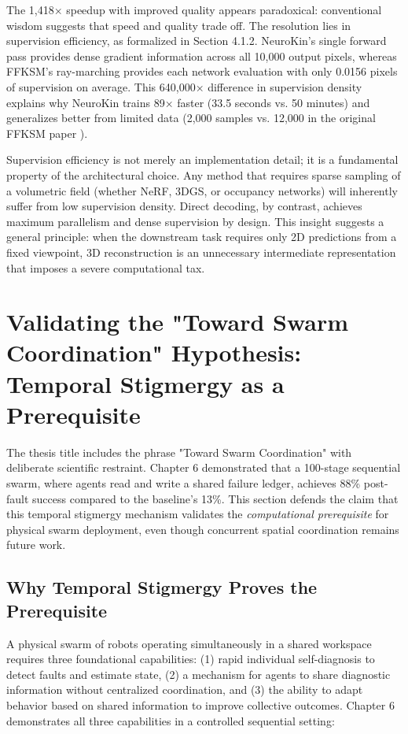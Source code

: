 \documentclass[12pt,a4paper,oneside]{report}
\begin{document}
The 1,418× speedup with improved quality appears paradoxical: conventional wisdom suggests that speed and quality trade off. The resolution lies in supervision efficiency, as formalized in Section 4.1.2. NeuroKin's single forward pass provides dense gradient information across all 10,000 output pixels, whereas FFKSM's ray-marching provides each network evaluation with only 0.0156 pixels of supervision on average. This 640,000× difference in supervision density explains why NeuroKin trains 89× faster (33.5 seconds vs. 50 minutes) and generalizes better from limited data (2,000 samples vs. 12,000 in the original FFKSM paper \cite{hu2024teaching}).

Supervision efficiency is not merely an implementation detail; it is a fundamental property of the architectural choice. Any method that requires sparse sampling of a volumetric field (whether NeRF, 3DGS, or occupancy networks) will inherently suffer from low supervision density. Direct decoding, by contrast, achieves maximum parallelism and dense supervision by design. This insight suggests a general principle: when the downstream task requires only 2D predictions from a fixed viewpoint, 3D reconstruction is an unnecessary intermediate representation that imposes a severe computational tax.

\section{Validating the "Toward Swarm Coordination" Hypothesis: Temporal Stigmergy as a Prerequisite}

The thesis title includes the phrase "Toward Swarm Coordination" with deliberate scientific restraint. Chapter 6 demonstrated that a 100-stage sequential swarm, where agents read and write a shared failure ledger, achieves 88\% post-fault success compared to the baseline's 13\%. This section defends the claim that this temporal stigmergy mechanism validates the \textit{computational prerequisite} for physical swarm deployment, even though concurrent spatial coordination remains future work.

\subsection{Why Temporal Stigmergy Proves the Prerequisite}

A physical swarm of robots operating simultaneously in a shared workspace requires three foundational capabilities: (1) rapid individual self-diagnosis to detect faults and estimate state, (2) a mechanism for agents to share diagnostic information without centralized coordination, and (3) the ability to adapt behavior based on shared information to improve collective outcomes. Chapter 6 demonstrates all three capabilities in a controlled sequential setting:
\end{document}

